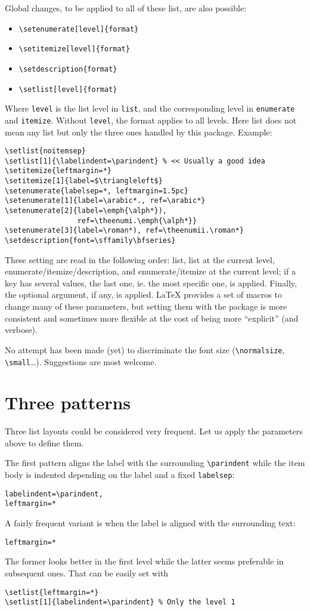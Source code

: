 \documentclass{article}
\begin{document}
Global changes, to be applied to all of these list, are also
possible:
\begin{itemize}
\item \verb|\setenumerate[level]{format}|
\item \verb|\setitemize[level]{format}| 
\item \verb|\setdescription{format}|
\item \verb|\setlist[level]{format}|
\end{itemize}
Where \verb|level| is the list level in \verb|list|, and the
corresponding level in \verb|enumerate| and \verb|itemize|.  Without
\verb|level|, the format applies to all levels.  Here list does not
mean any list but only the three ones handled by this package.
Example:
\begin{verbatim}
\setlist{noitemsep}
\setlist[1]{\labelindent=\parindent} % << Usually a good idea
\setitemize{leftmargin=*}
\setitemize[1]{label=$\triangleleft$}
\setenumerate{labelsep=*, leftmargin=1.5pc}
\setenumerate[1]{label=\arabic*., ref=\arabic*}
\setenumerate[2]{label=\emph{\alph*}),
                 ref=\theenumi.\emph{\alph*}}
\setenumerate[3]{label=\roman*), ref=\theenumii.\roman*}
\setdescription{font=\sffamily\bfseries}
\end{verbatim}
These setting are read in the following order: list,
list at the current level, enumerate/itemize/description,
and enumerate/itemize at the current level; if a key
has several values, the last one, ie. the most specific
one, is applied. Finally, the
optional argument, if any, is applied. \LaTeX{} provides
a set of macros to change many of these parameters, but
setting them with the package is more consistent and
sometimes more flexible at the cost of being more
``explicit'' (and verbose).

No attempt has been made (yet) to discriminate the font size
(\verb|\normalsize|, \verb|\small|\dots). Suggestions are
most welcome.

\section{Three patterns}

Three list layouts could be considered very
frequent. Let us apply the parameters above to define them.

The first pattern aligns the label with the surrounding
\verb|\parindent| while the item body is indented depending
on the label and a fixed \verb|labelsep|:
\begin{verbatim}
labelindent=\parindent,
leftmargin=*
\end{verbatim}
A fairly frequent variant is when  the label is aligned with
the surrounding text:
\begin{verbatim}
leftmargin=*
\end{verbatim}
The former looks better in the first level while the latter
seems preferable in subsequent ones. That can be easily
set with
\begin{verbatim}
\setlist{leftmargin=*}
\setlist[1]{labelindent=\parindent} % Only the level 1
\end{verbatim}
\end{document}
